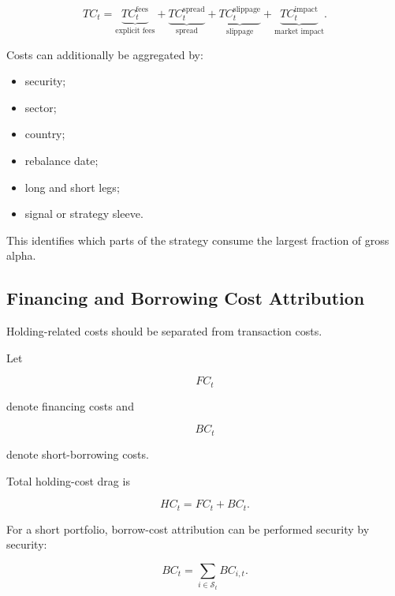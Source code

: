 \documentclass[11pt,a4paper]{article}
\begin{document}
\begin{equation}
\boxed{
TC_t
=
\underbrace{TC_t^{\mathrm{fees}}}_{\text{explicit fees}}
+
\underbrace{TC_t^{\mathrm{spread}}}_{\text{spread}}
+
\underbrace{TC_t^{\mathrm{slippage}}}_{\text{slippage}}
+
\underbrace{TC_t^{\mathrm{impact}}}_{\text{market impact}}.
}
\end{equation}

Costs can additionally be aggregated by:

\begin{itemize}
    \item security;
    \item sector;
    \item country;
    \item rebalance date;
    \item long and short legs;
    \item signal or strategy sleeve.
\end{itemize}

This identifies which parts of the strategy consume the largest fraction of
gross alpha.


\subsection{Financing and Borrowing Cost Attribution}

Holding-related costs should be separated from transaction costs.

Let

\begin{equation}
FC_t
\end{equation}

denote financing costs and

\begin{equation}
BC_t
\end{equation}

denote short-borrowing costs.

Total holding-cost drag is

\begin{equation}
\boxed{
HC_t
=
FC_t
+
BC_t.
}
\end{equation}

For a short portfolio, borrow-cost attribution can be performed security by
security:

\begin{equation}
\boxed{
BC_t
=
\sum_{i\in\mathcal{S}_t}
BC_{i,t}.
}
\end{equation}
\end{document}
